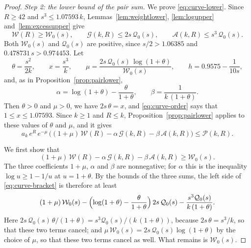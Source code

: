 \documentclass{amsart}
\theoremstyle{definition}
\theoremstyle{remark}
\numberwithin{equation}{section}
\begin{document}
\begin{proof}
\emph{Step 2: the lower bound of the pair sum.}
We prove \eqref{eq:curve-lower}. Since $R\ge42$ and
$s^3\le1.07593\,k$, Lemmas~\ref{lem:weightlower}, \ref{lem:logupper}
and~\ref{lem:excessupper} give
\[
\mathcal W(R)\ge\mathcal W_0(s),\qquad
\mathcal G(k,R)\le2s\,\mathcal Q_0(s),\qquad
\mathcal A(k,R)\le s^3\,\mathcal Q_0(s).
\]
Both $\mathcal W_0(s)$ and $\mathcal Q_0(s)$ are positive, since
$s/2>1.06385$ and $0.478731\,s>0.974453$. Let
\[
\theta=\frac{s^2}{2k},\qquad x=\frac{s^3}{k},\qquad
\mu=\frac{2s\,\mathcal Q_0(s)\,\log(1+\theta)}{\mathcal W_0(s)},\qquad
h=0.9575-\frac{1}{10s},
\]
and, as in Proposition~\ref{prop:pairlower},
\[
\alpha=\log(1+\theta)-\frac{\theta}{1+\theta},\qquad
\beta=\frac{1}{k\,(1+\theta)}.
\]
Then $\theta>0$ and $\mu>0$, we have $2s\,\theta=x$, and
\eqref{eq:curve-order} says that $1\le x\le1.07593$. Since $k\ge1$ and
$R\le k$, Proposition~\ref{prop:pairlower} applies to these values of
$\theta$ and $\mu$, and it gives
\begin{equation}\label{eq:curve-pairbound}
a_k\,e^{R}\,e^{-\mu}\,\bigl((1+\mu)\,\mathcal W(R)
-\alpha\,\mathcal G(k,R)-\beta\,\mathcal A(k,R)\bigr)\le\mathcal P(k,R).
\end{equation}

We first show that
\begin{equation}\label{eq:curve-bracket}
(1+\mu)\,\mathcal W(R)-\alpha\,\mathcal G(k,R)-\beta\,\mathcal A(k,R)
\ge\mathcal W_0(s) .
\end{equation}
The three coefficients $1+\mu$, $\alpha$ and $\beta$ are nonnegative; for
$\alpha$ this is the inequality
$\log u\ge1-1/u$ at $u=1+\theta$. By the bounds of the three sums, the
left side of
\eqref{eq:curve-bracket} is therefore at least
\[
(1+\mu)\,\mathcal W_0(s)
-\Bigl(\log(1+\theta)-\frac{\theta}{1+\theta}\Bigr)\,2s\,\mathcal Q_0(s)
-\frac{s^3\mathcal Q_0(s)}{k\,(1+\theta)} .
\]
Here
$2s\,\mathcal Q_0(s)\,\theta/(1+\theta)=s^3\mathcal Q_0(s)/(k\,(1+\theta))$,
because $2s\,\theta=s^3/k$, so that these two terms cancel; and
$\mu\,\mathcal W_0(s)=2s\,\mathcal Q_0(s)\log(1+\theta)$ by the choice of
$\mu$,
so that these two terms cancel as well. What remains is $\mathcal W_0(s)$.


\end{proof}
\end{document}
